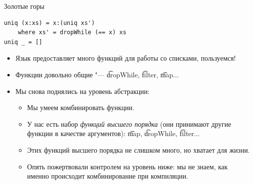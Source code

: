 \begin{frame}[fragile]{Золотые горы}
\begin{verbatim}
uniq (x:xs) = x:(uniq xs')
    where xs' = dropWhile (== x) xs
uniq _ = []
\end{verbatim}
	\begin{itemize}
		\item Язык предоставляет много функций для работы со списками, пользуемся!
		\item Функции довольно общие "--- \t{dropWhile}, \t{filter}, \t{map}...
		\item Мы снова поднялись на уровень абстракции:
			\begin{itemize}
				\item Мы умеем комбинировать функции.
				\item У нас есть набор \textit{функций высшего порядка} (они принимают другие функции в качестве аргументов): \t{map}, \t{dropWhile}, \t{filter}...
				\item Этих функций высшего порядка не слишком много, но хватает для жизни.
				\item Опять пожертвовали контролем на уровень ниже: мы не знаем, как именно происходит комбинирование при компиляции.
			\end{itemize}
	\end{itemize}
\end{frame}
